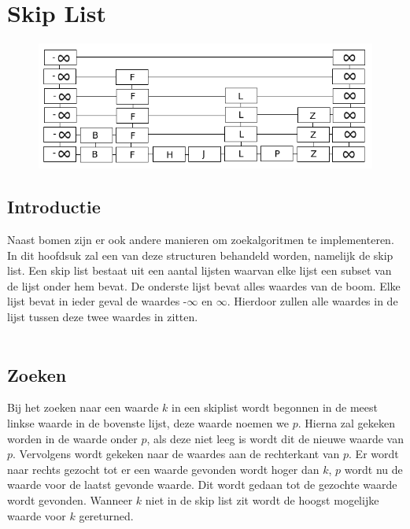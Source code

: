 \chapter{Skip List}
\label{sec:Hoofdstuk 6}

\begin{figure}[h]
	\centering
		\includegraphics[width=\textwidth]{chap6/skiplist}
	\label{fig:skiplist}
\end{figure}

\section{Introductie}
Naast bomen zijn er ook andere manieren om zoekalgoritmen te implementeren. In dit hoofdsuk zal een van deze structuren behandeld worden, namelijk de skip list. Een skip list bestaat uit een aantal lijsten waarvan elke lijst een subset van de lijst onder hem bevat. De onderste lijst bevat alles waardes van de boom. Elke lijst bevat in ieder geval de waardes -$\infty$ en $\infty$. Hierdoor zullen alle waardes in de lijst tussen deze twee waardes in zitten.\\
\\
\section{Zoeken}
Bij het zoeken naar een waarde $k$ in een skiplist wordt begonnen in de meest linkse waarde in de bovenste lijst, deze waarde noemen we $p$. Hierna zal gekeken worden in de waarde onder $p$, als deze niet leeg is wordt dit de nieuwe waarde van $p$. Vervolgens wordt gekeken naar de waardes aan de rechterkant van $p$. Er wordt naar rechts gezocht tot er een waarde gevonden wordt hoger dan $k$, $p$ wordt nu de waarde voor de laatst gevonde waarde. Dit wordt gedaan tot de gezochte waarde wordt gevonden. Wanneer $k$ niet in de skip list zit wordt de hoogst mogelijke waarde voor $k$ gereturned.\\
\\
